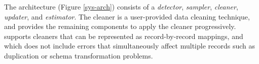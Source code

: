 








The \sys architecture (Figure \ref{sys-arch}) consists of a \emph{detector}, \emph{sampler}, \emph{cleaner}, \emph{updater}, and \emph{estimator}.
The cleaner is a user-provided data cleaning technique, and \sys provides the remaining components to apply the cleaner progressively.
\sys supports cleaners that can be represented as record-by-record mappings, and which does not include errors that simultaneously affect multiple records such as duplication or schema transformation problems.

